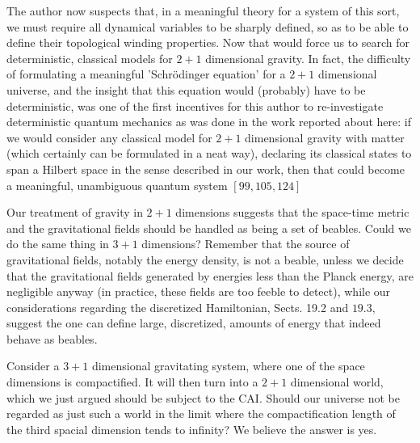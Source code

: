 \documentclass[main.tex]{subfiles}
\begin{document}
The author now suspects that, in a meaningful theory for a system of this sort, we must require all dynamical variables to be sharply defined, so as to be able to define their topological winding properties. Now that would force us to search for deterministic, classical models for $2+1$ dimensional gravity. In fact, the difficulty of formulating a meaningful 'Schrödinger equation' for a $2+1$ dimensional universe, and the insight that this equation would (probably) have to be deterministic, was one of the first incentives for this author to re-investigate deterministic quantum mechanics as was done in the work reported about here: if we would consider any classical model for $2+1$ dimensional gravity with matter (which certainly can be formulated in a neat way), declaring its classical states to span a Hilbert space in the sense described in our work, then that could become a meaningful, unambiguous quantum system $[99,105,124]$

Our treatment of gravity in $2+1$ dimensions suggests that the space-time metric and the gravitational fields should be handled as being a set of beables. Could we do the same thing in $3+1$ dimensions? Remember that the source of gravitational fields, notably the energy density, is not a beable, unless we decide that the gravitational fields generated by energies less than the Planck energy, are negligible anyway (in practice, these fields are too feeble to detect), while our considerations regarding the discretized Hamiltonian, Sects. 19.2 and $19.3,$ suggest the one can define large, discretized, amounts of energy that indeed behave as beables.

Consider a $3+1$ dimensional gravitating system, where one of the space dimensions is compactified. It will then turn into a $2+1$ dimensional world, which we just argued should be subject to the CAI. Should our universe not be regarded as just such a world in the limit where the compactification length of the third spacial dimension tends to infinity? We believe the answer is yes.





\subsection{}
\subsection{}
\subsection{}
\end{document}
